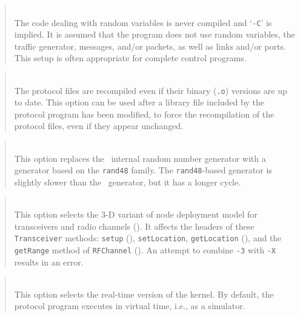 \begin{quote}
\noindent{}\\ \hspace{0in}
The code dealing with random variables is never compiled and
`{\tt -C}' is implied.
It is assumed that the program does not use random variables,
the traffic generator, messages, and/or packets, as well as links and/or
ports.
This setup is often appropriate for complete control programs.
\end{quote}

\begin{quote}
\noindent{}\\ \hspace{0in}
The protocol files are recompiled even if their binary ({\tt .o}) versions
are up to date.
This option can be used after a library file included by the protocol
program has been modified, to force the recompilation of the protocol
files, even if they appear unchanged.
\end{quote}

\begin{quote}
\noindent{}\\ \hspace{0in}
This option replaces the \smurph\ internal random number generator with
a generator based on the {\tt rand48} family.
The {\tt rand48}-based generator is slightly slower than the \smurph\ generator,
but it has a longer cycle.
\end{quote}

\begin{quote}
\noindent{}\\ \hspace{0in}
This option selects the 3-D variant of node deployment model for transceivers
and radio channels ().
It affects the headers of these {\tt Transceiver} methods:
{\tt setup} (), {\tt setLocation}, {\tt getLocation}
(), and the {\tt getRange} method of {\tt RFChannel}
().
An attempt to combine {\tt -3} with {\tt -X} results in an error.
\end{quote}

\begin{quote}
\noindent{}\\ \hspace{0in}
This option selects the real-time version of the kernel.
By default, the protocol program executes in virtual time, i.e., as a
simulator.
\end{quote}

